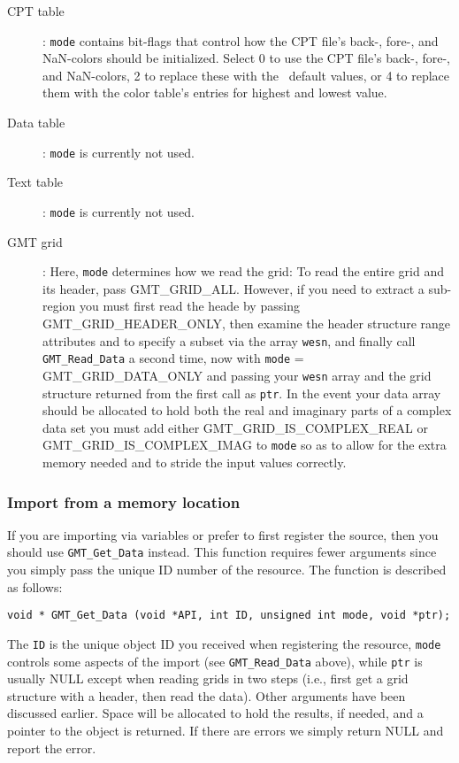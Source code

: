\documentclass[11pt]{report}
\begin{document}
\begin{description}
\item [CPT table]:  \texttt{mode} contains bit-flags that control how the CPT file's back-, fore-, and NaN-colors
should be initialized.  Select 0 to use the CPT file's back-, fore-, and NaN-colors, 2
to replace these with the \GMT\ default values, or 4 to replace them with the color table's
entries for highest and lowest value.
\item [Data table]:  \texttt{mode} is currently not used.
\item [Text table]:  \texttt{mode} is currently not used.
\item [GMT grid]:  Here, \texttt{mode} determines how we read the grid:
To read the entire grid and its header, pass GMT\_GRID\_ALL.  However, if you
need to extract a sub-region you must first read the heade by passing
GMT\_GRID\_HEADER\_ONLY, then examine the header structure range attributes and
to specify a subset via the array \texttt{wesn}, and finally call
\texttt{GMT\_Read\_Data} a second time, now with \texttt{mode} = GMT\_GRID\_DATA\_ONLY and passing your \texttt{wesn} array
and the grid structure returned from the first call as \texttt{ptr}.
In the event your data array should be allocated to hold both the real and imaginary parts of a
complex data set you must add either GMT\_GRID\_IS\_COMPLEX\_REAL or GMT\_GRID\_IS\_COMPLEX\_IMAG to \texttt{mode}
so as to allow for the extra memory needed and to stride the input values correctly.
\end{description}

\subsubsection{Import from a memory location}

If you are importing via variables or prefer to first register the source, then you
should use \texttt{GMT\_Get\_Data} instead.  This function requires fewer arguments since you simply
pass the unique ID number of the resource.  The function is described as follows:


\begin{verbatim}
void * GMT_Get_Data (void *API, int ID, unsigned int mode, void *ptr);
\end{verbatim}
The \texttt{ID} is the unique object ID you received when registering the resource,
\texttt{mode} controls some aspects of the import (see \texttt{GMT\_Read\_Data} above),
while \texttt{ptr} is usually NULL except when reading grids in two steps
(i.e., first get a grid structure with a header, then read the data).
Other arguments have been discussed earlier.  
Space will be allocated to hold the results, if needed, and a pointer to the object is returned.
If there are errors we simply return NULL and report the error.
\end{document}
